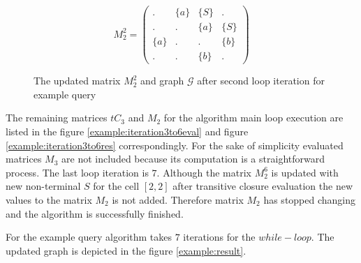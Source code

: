 \begin{figure}
    \begin{subfigure}[]{0.5\textwidth}
    \centering
    $$
    M_2^2 =
    \begin{pmatrix}
    .     & \{a\} & \{S\} & .     \\
    .     & .     & \{a\} & \{S\} \\
    \{a\} & .     & .     & \{b\} \\
    .     & .     & \{b\} & . 
    \end{pmatrix}
    $$
    \end{subfigure}
    \begin{subfigure}[]{0.4\textwidth}
    \centering
    \end{subfigure}
    \caption{The updated matrix $M_2^2$ and graph $\mathcal{G}$ after second loop iteration for example query}
    \label{example:iteration2res}
\end{figure}

The remaining matrices $tC_3$ and $M_2$ for the algorithm main loop execution are listed in the figure \ref{example:iteration3to6eval} and figure \ref{example:iteration3to6res} correspondingly. For the sake of simplicity evaluated matrices $M_3$ are not included because its computation is a straightforward process. The last loop iteration is $7$. Although the matrix $M_2^6$ is updated with new non-terminal $S$ for the cell $[2,2]$ after transitive closure evaluation the new values to the matrix $M_2$ is not added. Therefore matrix $M_2$ has stopped changing and the algorithm is successfully finished. 

For the example query algorithm takes $7$ iterations for the $while-loop$. The updated graph  is depicted in the figure \ref{example:result}.

